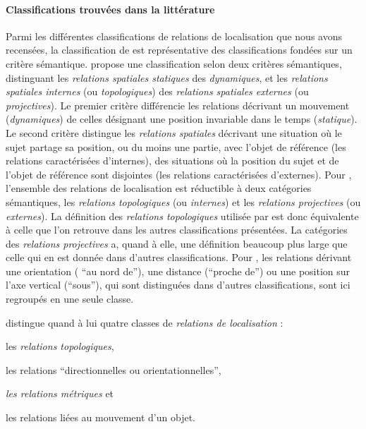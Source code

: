 \paragraph{Classifications trouvées dans la littérature}

Parmi les différentes classifications de relations de localisation que
nous avons recensées, la classification de \textcite{Borillo1998} est
représentative des classifications fondées sur un critère
sémantique. \textcite{Borillo1998} propose une classification selon
deux critères sémantiques, distinguant les \emph{relations spatiales
  statiques} des \emph{dynamiques}, et les \emph{relations spatiales
  internes} (ou \emph{topologiques}) des \emph{relations spatiales
  externes} (ou \emph{projectives}). Le premier critère différencie
les relations décrivant un mouvement (\emph{dynamiques}) de celles
désignant une position invariable dans le temps (\emph{statique}). Le
second critère distingue les \emph{relations spatiales} décrivant une
situation où le sujet partage sa position, ou du moins une partie,
avec l'objet de référence (\ie les relations caractérisées
d'internes), des situations où la position du sujet et de l'objet de
référence sont disjointes (\ie les relations caractérisées
d'externes). Pour \textcite{Borillo1998}, l'ensemble des relations de
localisation est réductible à deux catégories sémantiques, les
\emph{relations topologiques} (ou \emph{internes}) et les
\emph{relations projectives} (ou \emph{externes}). La définition des
\emph{relations topologiques} utilisée par \textcite{Borillo1998} est
donc équivalente à celle que l'on retrouve dans les autres
classifications présentées. La catégories des \emph{relations
  projectives} a, quand à elle, une définition beaucoup plus large que
celle qui en est donnée dans d'autres classifications. Pour
\textcite{Borillo1998}, les relations dérivant une orientation (\eg
\enquote{au nord de}), une distance (\eg \enquote{proche de}) ou une
position sur l'axe vertical (\eg \enquote{sous}), qui sont distinguées
dans d'autres classifications, sont ici regroupés en une seule classe.

\textcite{Pustejovsky2017} distingue quand à lui quatre classes de
\emph{relations de localisation} :
%
\begin{enumerate*}[label=(\alph*)]
\item les \emph{relations topologiques},
  \item les relations \enquote{directionnelles ou
  orientationnelles},
  \item \emph{les relations métriques} et
  \item les relations liées au mouvement d'un objet.
\end{enumerate*}
%


